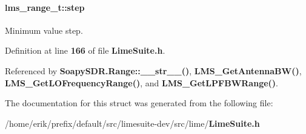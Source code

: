 \paragraph[{step}]{ lms\+\_\+range\+\_\+t\+::step}\label{structlms__range__t_a8ec6b2a96f23e96c6bd9211d366db0ba}


Minimum value step. 



Definition at line {\bf 166} of file {\bf Lime\+Suite.\+h}.



Referenced by {\bf Soapy\+S\+D\+R.\+Range\+::\+\_\+\+\_\+str\+\_\+\+\_\+()}, {\bf L\+M\+S\+\_\+\+Get\+Antenna\+B\+W()}, {\bf L\+M\+S\+\_\+\+Get\+L\+O\+Frequency\+Range()}, and {\bf L\+M\+S\+\_\+\+Get\+L\+P\+F\+B\+W\+Range()}.



The documentation for this struct was generated from the following file\+:\begin{DoxyCompactItemize}
\item 
/home/erik/prefix/default/src/limesuite-\/dev/src/lime/{\bf Lime\+Suite.\+h}\end{DoxyCompactItemize}
